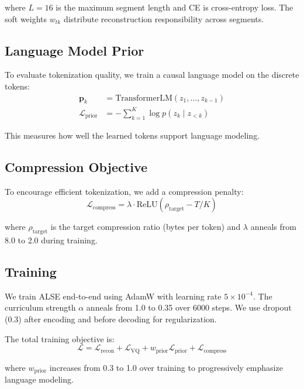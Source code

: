\documentclass{article}
\begin{document}
where $L=16$ is the maximum segment length and CE is cross-entropy loss. The soft weights $w_{tk}$ distribute reconstruction responsibility across segments.

\subsection{Language Model Prior}

To evaluate tokenization quality, we train a causal language model on the discrete tokens:
\begin{align}
\mathbf{p}_k &= \text{TransformerLM}(z_1, \ldots, z_{k-1}) \\
\mathcal{L}_{\text{prior}} &= -\sum_{k=1}^{K} \log p(z_k \mid z_{<k})
\end{align}

This measures how well the learned tokens support language modeling.

\subsection{Compression Objective}

To encourage efficient tokenization, we add a compression penalty:
\begin{equation}
\mathcal{L}_{\text{compress}} = \lambda \cdot \text{ReLU}(\rho_{\text{target}} - T/K)
\end{equation}

where $\rho_{\text{target}}$ is the target compression ratio (bytes per token) and $\lambda$ anneals from 8.0 to 2.0 during training.

\subsection{Training}

We train ALSE end-to-end using AdamW \cite{loshchilov2019adamw} with learning rate $5 \times 10^{-4}$. The curriculum strength $\alpha$ anneals from 1.0 to 0.35 over 6000 steps. We use dropout (0.3) after encoding and before decoding for regularization.

The total training objective is:
\begin{equation}
\mathcal{L} = \mathcal{L}_{\text{recon}} + \mathcal{L}_{\text{VQ}} + w_{\text{prior}} \mathcal{L}_{\text{prior}} + \mathcal{L}_{\text{compress}}
\end{equation}

where $w_{\text{prior}}$ increases from 0.3 to 1.0 over training to progressively emphasize language modeling.
\end{document}
